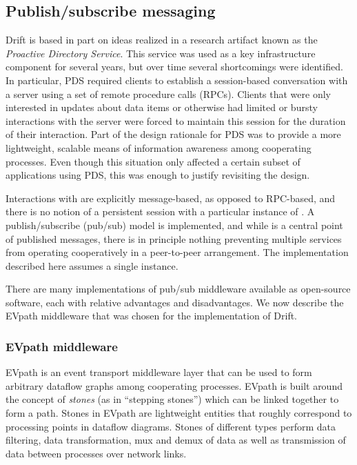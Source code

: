 \subsection{Publish/subscribe messaging}

Drift is based in part on ideas realized in a research artifact known as the \emph{Proactive Directory
  Service}\cite{bustamante02:_scalab_direc_servic_using_proac}.  This service was used as a key
infrastructure component for several years, but over time several shortcomings were identified.  In
particular, PDS required clients to establish a session-based conversation with a server using a set of
remote procedure calls (RPCs). Clients that were only interested in updates about data items or otherwise
had limited or bursty interactions with the server were forced to maintain this session for the duration
of their interaction.  Part of the design rationale for PDS was to provide a more lightweight,
scalable means of information awareness among cooperating processes.  Even though this situation only
affected a certain subset of applications using PDS, this was enough to justify revisiting the design.

Interactions with \driftd are explicitly message-based, as opposed to RPC-based, and there is no notion
of a persistent session with a particular instance of \driftd. A publish/subscribe (pub/sub) model is implemented,
and while \driftd is a central point of published messages, there is in principle nothing preventing
multiple \driftd services from operating cooperatively in a peer-to-peer arrangement.  The implementation
described here assumes a single \driftd instance.

There are many implementations of pub/sub middleware available as open-source software, each with
relative advantages and disadvantages.  We now describe the EVpath middleware that was chosen for the
implementation of Drift.

\subsubsection{EVpath middleware}

EVpath\cite{eisenhauer09:_event} is an event transport middleware layer that can be used to form
arbitrary dataflow graphs among cooperating processes.  EVpath is built around the concept of
\emph{stones} (as in ``stepping stones'') which can be linked together to form a path.  Stones in EVpath
are lightweight entities that roughly correspond to processing points in dataflow diagrams.  Stones of
different types perform data filtering, data transformation, mux and demux of data as well as
transmission of data between processes over network links.  

